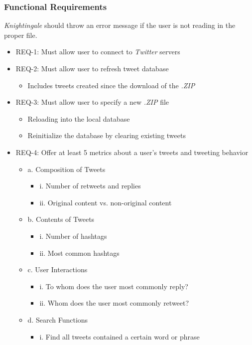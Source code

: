 \documentclass[a4paper, 12pt]{article}
\begin{document}
\subsubsection{Functional Requirements} \label{sec:func}
\begin{adjustwidth}{3em}{0pt}
\textit{Knightingale} should throw an error message if the user is not reading in the proper file.
\end{adjustwidth}

\begin{itemize}
\item REQ-1: Must allow user to connect to \textit{Twitter} servers
\item REQ-2: Must allow user to refresh tweet database
\begin{itemize}
\item Includes tweets created since the download of the \textit{.ZIP}
\end{itemize}
\item REQ-3: Must allow user to specify a new \textit{.ZIP} file
\begin{itemize}
\item Reloading into the local database
\item Reinitialize the database by clearing existing tweets
\end{itemize}
\item REQ-4: Offer at least 5 metrics about a user's tweets and tweeting behavior
\begin {itemize} 
\item a. Composition of Tweets
\begin{itemize}
\item i. Number of retweets and replies
\item ii. Original content vs. non-original content
\end{itemize}
\item b. Contents of Tweets
\begin{itemize}
\item i. Number of hashtags
\item ii. Most common hashtags
\end{itemize}
\item c. User Interactions
\begin{itemize}
\item i. To whom does the user most commonly reply?
\item ii. Whom does the user most commonly retweet?
\end{itemize}
\item d. Search Functions
\begin{itemize}
\item i. Find all tweets contained a certain word or phrase
\end{itemize}
\end{itemize}
\end{itemize}
\end{document}
